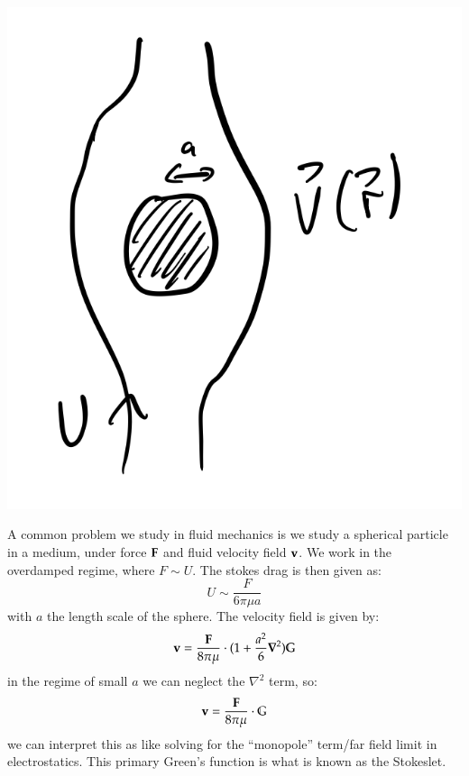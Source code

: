 \begin{center}
    \includegraphics[scale=0.35]{Lectures/Images/lec12-sphereinfluid.png}
\end{center}

A common problem we study in fluid mechanics is we study a spherical particle in a medium, under force $\mathbf{F}$ and fluid velocity field $\mathbf{v}$. We work in the overdamped regime, where $F \sim U$. The stokes drag is then given as:
\begin{equation}
    U \sim \frac{F}{6\pi \mu a}
\end{equation}
with $a$ the length scale of the sphere. The velocity field is given by:
\begin{equation}
    \v{v} = \frac{\v{F}}{8\pi\mu}\cdot (1 + \frac{a^2}{6}\nabla^2)\mathbb{G}
\end{equation}
in the regime of small $a$ we can neglect the $\nabla^2$ term, so:
\begin{equation}
    \mathbf{v} = \frac{\mathbf{F}}{8\pi\mu}\cdot \mathbb{G}
\end{equation}
we can interpret this as like solving for the ``monopole'' term/far field limit in electrostatics. This primary Green's function is what is known as the Stokeslet.

